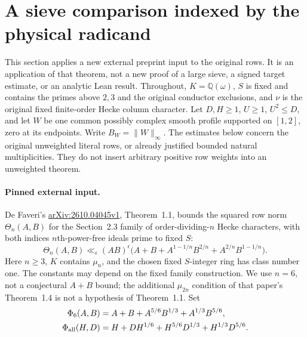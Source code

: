 \section{A sieve comparison indexed by the physical radicand}\label{phy:core}
This section applies a new external preprint input to the original rows.
It is an application of that theorem, not a new proof of a large sieve,
a signed target estimate, or an analytic Lean result.
Throughout, $K=\mathbb Q(\omega)$, $S$ is fixed and contains the primes
above $2,3$ and the original conductor exclusions, and $\nu$ is the
original fixed finite-order Hecke column character. Let $D,H\ge1$, $U\ge1$,
$U^2\le D$, and let $W$ be one common possibly complex smooth profile
supported on $[1,2]$, zero at its endpoints. Write $B_W=\|W\|_\infty$.
The estimates below concern the original unweighted literal rows, or
already justified bounded natural multiplicities. They do not insert
arbitrary positive row weights into an unweighted theorem.

\paragraph{Pinned external input.}
De Faveri's \href{https://arxiv.org/abs/2610.04045v1}{arXiv:2610.04045v1},
Theorem~1.1, bounds the squared row norm $\Theta_n(A,B)$ for the
Section~2.3 family of order-dividing-$n$ Hecke characters, with both
indices $n$th-power-free ideals prime to fixed $S$:
\begin{equation}\label{phy:input}
 \Theta_n(A,B)\ll_\epsilon(AB)^\epsilon
 \bigl(A+B+A^{1-1/n}B^{2/n}+A^{2/n}B^{1-1/n}\bigr).
\end{equation}
Here $n\ge3$, $K$ contains $\mu_n$, and the chosen fixed $S$-integer
ring has class number one. The constants may depend on the fixed
family construction. We use $n=6$, not a conjectural $A+B$ bound;
the additional $\mu_{2n}$ condition of that paper's Theorem~1.4 is
not a hypothesis of Theorem~1.1. Set
\begin{align*}
 \Phi_6(A,B)&=A+B+A^{5/6}B^{1/3}+A^{1/3}B^{5/6},\\
 \Phi_{\rm all}(H,D)&=H+DH^{1/6}
       +H^{5/6}D^{1/3}+H^{1/3}D^{5/6}.
\end{align*}

